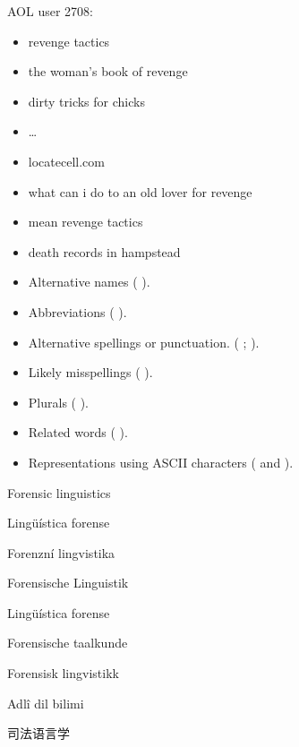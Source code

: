\documentclass[a4paper,landscape,headrule,footrule,xetex]{foils}
\begin{document}
AOL user 2708:
\begin{itemize}\addtolength{\itemsep}{-1ex}
\item revenge tactics
\item the woman's book of revenge
\item dirty tricks for chicks
\item \ldots
\item locatecell.com
\item what can i do to an old lover for revenge
\item mean revenge tactics
\item death records in hampstead
\end{itemize}


\begin{itemize}\addtolength{\itemsep}{-1ex}
\item  Alternative names ( \into {}).
\item Abbreviations ( \into {}).
\item Alternative spellings or punctuation. ( \into {};  \into {}).
\item Likely misspellings ( \into {}).
\item Plurals ( \into {}).
\item Related words ( \into {}).
\item Representations using ASCII characters ( and  \into  {}). 
 \end{itemize}
 
\MyLogo{}
\begin{description}\addtolength{\itemsep}{-1ex}
\item[en] Forensic linguistics
\item[ca] Lingüística forense
\item[cs] Forenzní lingvistika
\item[de] Forensische Linguistik
\item[es] Lingüística forense
\item[nl] Forensische taalkunde
\item[no] Forensisk lingvistikk
\item[tr] Adlî dil bilimi
\item[zh] 司法语言学
\end{description}
\end{document}
